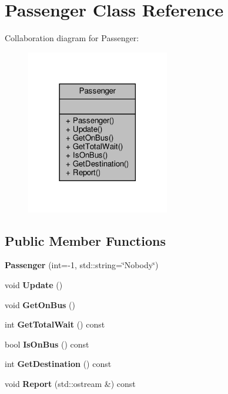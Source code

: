 \hypertarget{classPassenger}{}\section{Passenger Class Reference}
\label{classPassenger}


Collaboration diagram for Passenger\+:
\nopagebreak
\begin{figure}[H]
\begin{center}
\leavevmode
\includegraphics[width=177pt]{classPassenger__coll__graph}
\end{center}
\end{figure}
\subsection*{Public Member Functions}
\begin{DoxyCompactItemize}
\item 
\mbox{\label{classPassenger_a5c3addb9a6fd03e5e5642ed844e2702c}} 
{\bfseries Passenger} (int=-\/1, std\+::string=\char`\"{}Nobody\char`\"{})
\item 
\mbox{\label{classPassenger_a960de3b29fc17a2c2d79c0b79d5cf299}} 
void {\bfseries Update} ()
\item 
\mbox{\label{classPassenger_ae2ba639cfef39781ac079778578bd9fe}} 
void {\bfseries Get\+On\+Bus} ()
\item 
\mbox{\label{classPassenger_a25158560f790ef7ef06d94c414b34f25}} 
int {\bfseries Get\+Total\+Wait} () const
\item 
\mbox{\label{classPassenger_a2acf008ec444afcc859b914ee24add0e}} 
bool {\bfseries Is\+On\+Bus} () const
\item 
\mbox{\label{classPassenger_a49db0ee527377aae6077df190a11501c}} 
int {\bfseries Get\+Destination} () const
\item 
\mbox{\label{classPassenger_aee3f9d7f6f2a848034971559faf65248}} 
void {\bfseries Report} (std\+::ostream \&) const
\end{DoxyCompactItemize}


